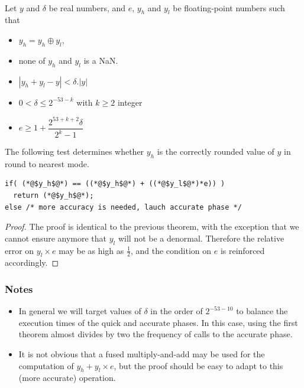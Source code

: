 \begin{theorem}
\label{th:roundingRN2}
~\\
  Let $y$ and $\delta$ be real numbers, and $e$, $y_h$ and $y_l$ be
  floating-point numbers such that 
  \begin{itemize}
  \item $y_h=y_h\oplus y_l$,
  \item none of $y_h$ and $y_l$ is a  NaN.
  \item $|y_h+y_l - y| < \delta.|y|$
  \item $0< \delta \le 2^{-53-k}$ with $k\ge 2$ integer
  \item $e\ge 1+  \dfrac{2^{53+k+2}\delta}{2^{k}-1}$
\end{itemize}

The following test determines whether $y_h$ is the
  correctly rounded value of $y$ in  round to nearest mode.

\begin{lstlisting}[firstnumber=1]
if( (*@$y_h$@*) == ((*@$y_h$@*) + ((*@$y_l$@*)*e)) )
  return (*@$y_h$@*);
else /* more accuracy is needed, lauch accurate phase */
\end{lstlisting}
\end{theorem}

\begin{proof}
  The proof is identical to the previous theorem, with the exception
  that we cannot ensure anymore that $y_l$ will not be a denormal.
  Therefore the relative error on $y_l\times e$ may be as high as
  $\frac{1}{2}$, and the condition on $e$ is reinforced accordingly.
\end{proof}


\subsubsection*{Notes}

\begin{itemize}
\item In general we will target values of $\delta$ in the order of
  $2^{-53-10}$ to balance the execution times of the quick and
  accurate phases. In this case, using the first theorem almost divides
  by two the frequency of calls to the accurate phase. 
\item It is not obvious that a fused multiply-and-add may be used for
  the computation of $y_h+y_l\times e$, but the proof should be easy
  to adapt to this (more accurate) operation.
\end{itemize}



